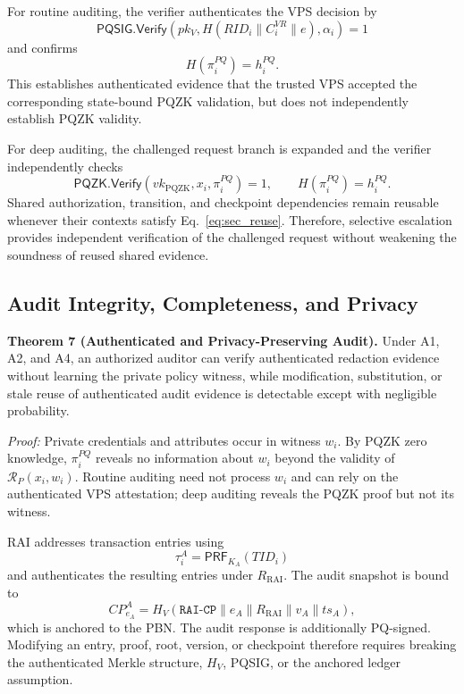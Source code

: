\documentclass[lettersize,journal]{IEEEtran}
\begin{document}
For routine auditing, the verifier authenticates the VPS decision by
\begin{equation}
\mathsf{PQSIG.Verify}
(pk_V,H(RID_i\parallel C_i^{VR}\parallel e),\alpha_i)=1
\end{equation}
and confirms
\begin{equation}
H(\pi_i^{PQ})=h_i^{PQ}.
\end{equation}
This establishes authenticated evidence that the trusted VPS accepted
the corresponding state-bound PQZK validation, but does not
independently establish PQZK validity.

For deep auditing, the challenged request branch is expanded and the
verifier independently checks
\begin{equation}
\mathsf{PQZK.Verify}
(vk_{\mathrm{PQZK}},x_i,\pi_i^{PQ})=1,
\qquad
H(\pi_i^{PQ})=h_i^{PQ}.
\end{equation}
Shared authorization, transition, and checkpoint dependencies remain
reusable whenever their contexts satisfy
Eq.~\eqref{eq:sec_reuse}. Therefore, selective escalation provides
independent verification of the challenged request without weakening
the soundness of reused shared evidence.

\subsection{Audit Integrity, Completeness, and Privacy}

\textbf{Theorem 7 (Authenticated and Privacy-Preserving Audit).}
Under A1, A2, and A4, an authorized auditor can verify authenticated
redaction evidence without learning the private policy witness, while
modification, substitution, or stale reuse of authenticated audit
evidence is detectable except with negligible probability.

\emph{Proof:}
Private credentials and attributes occur in witness $w_i$. By PQZK
zero knowledge, $\pi_i^{PQ}$ reveals no information about $w_i$ beyond
the validity of $\mathcal{R}_P(x_i,w_i)$. Routine auditing need not
process $w_i$ and can rely on the authenticated VPS attestation;
deep auditing reveals the PQZK proof but not its witness.

RAI addresses transaction entries using
\begin{equation}
\tau_i^A=\mathsf{PRF}_{K_A}(TID_i)
\end{equation}
and authenticates the resulting entries under
$R_{\mathrm{RAI}}$. The audit snapshot is bound to
\begin{equation}
CP_{e_A}^{A}
=
H_V(\texttt{RAI-CP}\parallel e_A
\parallel R_{\mathrm{RAI}}\parallel v_A\parallel ts_A),
\end{equation}
which is anchored to the PBN. The audit response is additionally
PQ-signed. Modifying an entry, proof, root, version, or checkpoint
therefore requires breaking the authenticated Merkle structure,
$H_V$, PQSIG, or the anchored ledger assumption.
\end{document}
